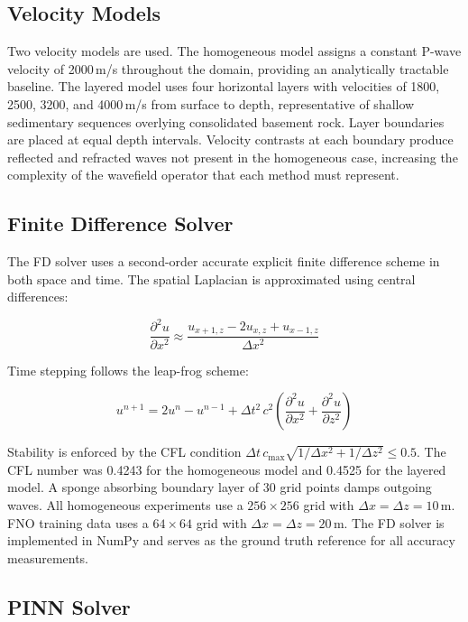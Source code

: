 \documentclass[12pt,a4paper]{article}
\begin{document}
\subsection{Velocity Models}

Two velocity models are used. The homogeneous model assigns a
constant P-wave velocity of 2000\,m/s throughout the domain,
providing an analytically tractable baseline. The layered model
uses four horizontal layers with velocities of 1800, 2500, 3200,
and 4000\,m/s from surface to depth, representative of shallow
sedimentary sequences overlying consolidated basement rock. Layer
boundaries are placed at equal depth intervals. Velocity
contrasts at each boundary produce reflected and refracted waves
not present in the homogeneous case, increasing the complexity of
the wavefield operator that each method must represent.

\subsection{Finite Difference Solver}

The FD solver uses a second-order accurate explicit finite
difference scheme in both space and time. The spatial Laplacian
is approximated using central differences:

\begin{equation}
\frac{\partial^2 u}{\partial x^2} \approx
\frac{u_{x+1,z} - 2u_{x,z} + u_{x-1,z}}{\Delta x^2}
\label{eq:fd}
\end{equation}

Time stepping follows the leap-frog scheme:

\begin{equation}
u^{n+1} = 2u^n - u^{n-1} +
\Delta t^2\, c^2\left(\frac{\partial^2 u}{\partial x^2} +
\frac{\partial^2 u}{\partial z^2}\right)
\label{eq:leapfrog}
\end{equation}

Stability is enforced by the CFL condition
$\Delta t\, c_{\max} \sqrt{1/\Delta x^2 + 1/\Delta z^2} \leq
0.5$. The CFL number was 0.4243 for the homogeneous model and
0.4525 for the layered model. A sponge absorbing boundary layer
of 30 grid points damps outgoing waves. All homogeneous
experiments use a $256 \times 256$ grid with $\Delta x = \Delta z
= 10$\,m. FNO training data uses a $64 \times 64$ grid with
$\Delta x = \Delta z = 20$\,m. The FD solver is implemented in
NumPy and serves as the ground truth reference for all accuracy
measurements.

\subsection{PINN Solver}
\end{document}
